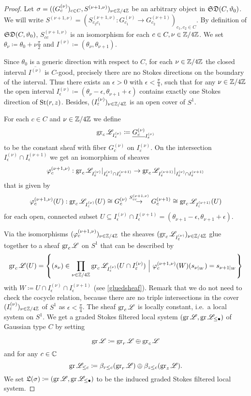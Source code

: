 \begin{proof} Let $\sigma =((G_c^{(\nu)})_{c \in C}, S^{(\nu+1,\nu)})_{\nu \in \mathbb{Z}/4\mathbb{Z}}$ be an arbitrary object in $\mathfrak{SD}(C,\vartheta_0)$. We will write $S^{(\nu+1,\nu)} = (S_{c_2c_1}^{(\nu+1,\nu)} : G_{c_1}^{(\nu)} \to G_{c_2}^{(\nu+1)})_{c_1,c_2 \in C}$. By definition of $\mathfrak{SD}(C,\vartheta_0)$, $S_{cc}^{(\nu+1,\nu)}$ is an isomorphism for each $c \in C, \nu \in \mathbb{Z}/4\mathbb{Z}$. We set $\theta_\nu \coloneqq \theta_0 + \nu\frac{\pi}{2}$ and $I^{(\nu)}\coloneqq (\theta_\nu, \theta_{\nu+1})$. 

Since $\theta_0$ is a generic direction with respect to $C$, for each $\nu \in \mathbb{Z}/4\mathbb{Z}$ the closed interval $\overline{I^{(\nu)}}$ is $C$-good, precisely there are no Stokes directions on the boundary of the interval. Thus there exists an $\epsilon>0$ with $\epsilon < \frac{\pi}{4}$, such that for any $\nu\in \mathbb{Z}/4\mathbb{Z}$ the open interval $I^{(\nu)}_\epsilon \coloneqq (\theta_\nu - \epsilon, \theta_{\nu+1} + \epsilon)$ contains exactly one Stokes direction of $\operatorname{St}(r,z)$. Besides, $(I^{(\nu)}_\varepsilon)_{\nu \in \mathbb{Z}/4\mathbb{Z}}$ is an open cover of $S^1$. 


For each $c \in C$ and $\nu \in \mathbb{Z}/4\mathbb{Z}$ we define
\[
\operatorname{gr}_c\mathscr{L}_{I^{(\nu)}_\varepsilon} \coloneqq \underline{G_c^{(\nu)}}_{I^{(\nu)}_\varepsilon}
\]
to be the constant sheaf with fiber $G_c^{(\nu)}$ on $I^{(\nu)}_\varepsilon$.
On the intersection $I_\epsilon^{(\nu)} \cap I_\epsilon^{(\nu+1)}$ we get an isomorphism of sheaves \[\varphi_c^{(\nu+1,\nu)}: \operatorname{gr}_c\mathscr{L}_{I_\varepsilon^{(\nu)}}\vert_{I_\varepsilon^{(\nu)} \cap I_\varepsilon^{(\nu+1)}} \to \operatorname{gr}_c\mathscr{L}_{I_\varepsilon^{(\nu+1)}}\vert_{I_\varepsilon^{(\nu)} \cap I_\varepsilon^{(\nu+1)}}\]
that is given by 
\[
\varphi_c^{(\nu+1,\nu)}(U): \operatorname{gr}_c\mathscr{L}_{I_\varepsilon^{(\nu)}}(U) \cong G_c^{(\nu)}  \overset{S_{cc}^{(\nu+1,\nu)}}{\to} G_c^{(\nu+1)} \cong \operatorname{gr}_c\mathscr{L}_{I_\varepsilon^{(\nu+1)}}(U)
\]
for each open, connected subset $U \subseteq I_\epsilon^{(\nu)} \cap I_\epsilon^{(\nu+1)} = (\theta_{\nu+1}-\epsilon, \theta_{\nu+1}+\epsilon)$.

Via the isomorphisms $(\varphi_c^{(\nu+1,\nu)})_{\nu \in \mathbb{Z}/4\mathbb{Z}}$ the sheaves $(\operatorname{gr}_c\mathscr{L}_{I_\varepsilon^{(\nu)}})_{\nu \in \mathbb{Z}/4\mathbb{Z}}$ glue together to a sheaf $\operatorname{gr}_c\mathscr{L}$ on $S^1$ that can be described by 
\[
\operatorname{gr}_c\mathscr{L}(U) = \left\{(s_\nu) \in \prod_{\nu \in \mathbb{Z}/4\mathbb{Z}} \operatorname{gr}_c\mathscr{L}_{I_\varepsilon^{(\nu)}}(U \cap I_\varepsilon^{(\nu)}) ~\Big\vert~ \varphi_c^{(\nu+1,\nu)}(W)(s_{\nu\vert_{W}}) = s_{\nu+1\vert_{W}}  \right\}
\]
with $W \coloneqq U \cap I^{(\nu)}_\epsilon \cap I_\epsilon^{(\nu+1)}$ (see \ref{gluedsheaf}).
 Remark that we do not need to check the cocycle relation, because there are no triple intersections in the cover $(I_\varepsilon^{(\nu)})_{\nu \in \mathbb{Z}/4\mathbb{Z}}$ of $S^1$ as $\epsilon<\frac{\pi}{4}$. The sheaf $\operatorname{gr}_c\mathscr{L}$ is locally constant, i.e.\ a local system on $S^1$. 
We get a graded Stokes filtered local system $(\operatorname{gr}\mathscr{L},\operatorname{gr}\mathscr{L}_{\leq \bullet})$ of Gaussian type $C$ by setting 

\[\operatorname{gr}\mathscr{L} \coloneqq \operatorname{gr}_r\mathscr{L} \oplus \operatorname{gr}_c\mathscr{L}\]
and for any $c \in \mathbb{C}$ 
\[\operatorname{gr}\mathscr{L}_{\leq c} \coloneqq \beta_{r\leq c}(\operatorname{gr}_r\mathscr{L}) \oplus \beta_{z \leq c}(\operatorname{gr}_z\mathscr{L}).\]
 We set $\mathfrak{L}(\sigma) \coloneqq (\operatorname{gr}\mathscr{L}, \operatorname{gr}\mathscr{L}_{\leq \bullet})$ to be the induced graded Stokes filtered local system.
\end{proof}

